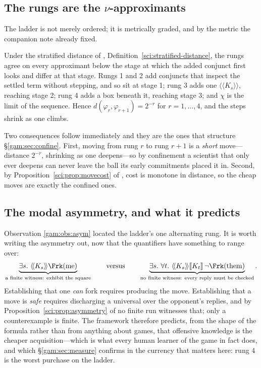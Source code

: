 \subsection{The rungs are the $\nu$-approximants}\label{gam:S5.2}

The ladder is not merely ordered; it is metrically graded, and by the metric the
companion note already fixed.

\begin{proposition}\label{gam:ladder-chain-shrinking-steps}
Under the stratified distance of \chSci, Definition~\ref{sci:stratified-distance}, the rungs
agree on every approximant below the stage at which the added conjunct first
looks and differ at that stage. Rungs 1 and 2 add conjuncts that inspect the
settled term without stepping, and so sit at stage 1; rung 3 adds one
$\langle\!\langle K_s \rangle\!\rangle$, reaching stage 2; rung 4 adds a box
beneath it, reaching stage 3; and $\chi$ is the limit of the sequence. Hence
$d(\varphi_r,\varphi_{r+1}) = 2^{-r}$ for $r = 1, \dots, 4$, and the steps
shrink as one climbs.
\end{proposition}

Two consequences follow immediately and they are the ones that structure
\S\ref{gam:sec:confine}. First, moving from rung $r$ to rung $r+1$ is a \emph{short}
move---distance $2^{-r}$, shrinking as one deepens---so by confinement a
scientist that only ever deepens can never leave the ball its early commitments
placed it in. Second, by Proposition~\ref{sci:prop:movecost} of \chSci, cost is monotone in
distance, so the cheap moves are exactly the confined ones.

\subsection{The modal asymmetry, and what it predicts}\label{gam:S5.3}

Observation \ref{gam:obs:asym} located the ladder's one alternating rung. It is
worth writing the asymmetry out, now that the quantifiers have something to
range over:
\[
\underbrace{\exists s.\ \langle\!\langle K_s\rangle\!\rangle \Frk(\text{me})}
_{\text{a finite witness: exhibit the square}}
\qquad\text{versus}\qquad
\underbrace{\exists s.\ \forall t.\ \langle\!\langle K_s\rangle\!\rangle
[\![K_t]\!]\,\neg\Frk(\text{them})}
_{\text{no finite witness: every reply must be checked}} .
\]
Establishing that one \emph{can} fork requires producing the move. Establishing
that a move is \emph{safe} requires discharging a universal over the opponent's
replies, and by Proposition~\ref{sci:prop:asymmetry} of \chSci no finite run witnesses that;
only a counterexample is finite. The framework therefore predicts, from the
shape of the formula rather than from anything about games, that offensive
knowledge is the cheaper acquisition---which is what every human learner of the
game in fact does, and which \S\ref{gam:sec:measure} confirms in the currency that
matters here: rung 4 is the worst purchase on the ladder.


